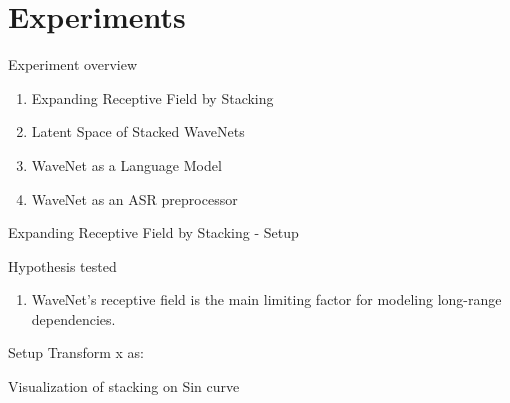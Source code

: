 \documentclass[
  ignorenonframetext,
  aspectratio=169,
]{beamer}
\providecommand{\tightlist}{%
  \setlength{\itemsep}{0pt}\setlength{\parskip}{0pt}}
\begin{document}
\hypertarget{experiments}{%
\section{Experiments}\label{experiments}}

\begin{frame}{Experiment overview}
\protect\hypertarget{experiment-overview}{}
\begin{enumerate}
\tightlist
\item
  Expanding Receptive Field by Stacking
\item
  Latent Space of Stacked WaveNets
\item
  WaveNet as a Language Model
\item
  WaveNet as an ASR preprocessor
\end{enumerate}
\end{frame}

\begin{frame}{Expanding Receptive Field by Stacking - Setup}
\protect\hypertarget{expanding-receptive-field-by-stacking---setup}{}
\begin{block}{Hypothesis tested}
\protect\hypertarget{hypothesis-tested}{}
\begin{enumerate}[<+->]
\tightlist
\item
  WaveNet's receptive field is the main limiting factor for modeling
  long-range dependencies.
\end{enumerate}
\end{block}

\begin{block}{Setup}
\protect\hypertarget{setup}{}
Transform x as:

\begin{figure}
\centering
\resizebox{\columnwidth}{!}{

}\end{figure}
\end{block}
\end{frame}

\begin{frame}{Visualization of stacking on Sin curve}
\protect\hypertarget{visualization-of-stacking-on-sin-curve}{}
\begin{figure}
\centering
\resizebox{1.0\columnwidth}{!}{
\begin{tikzpicture}

}
\end{figure}
\end{frame}
\end{document}
